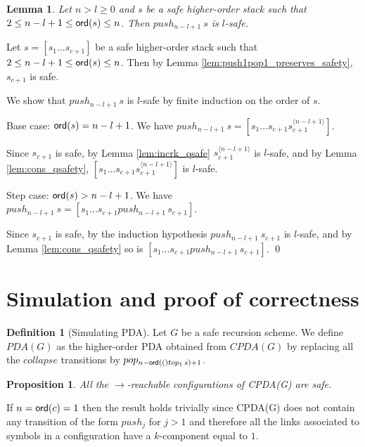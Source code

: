 \documentclass[a4paper]{article}
\newtheorem{lemma}{Lemma}[section]
\newtheorem{proposition}{Proposition}[section]
\theoremstyle{remark}
\theoremstyle{definition}
\newtheorem{definition}{Definition}[section]
\begin{document}
\begin{lemma}
\label{lem:pushj_safe_implies_l-safe} Let $n>l\geq 0$ and $s$ be a safe higher-order stack such that $2 \leq n-l+1 \leq {\sf ord}(s) \leq n$. Then $push_{n-l+1}\ s$ is $l$-safe.
\end{lemma}
\proof
Let $s=[s_1 \ldots s_{c+1}]$ be a safe higher-order stack such that $2 \leq n-l+1 \leq {\sf ord}(s) \leq n$. Then by Lemma \ref{lem:push1pop1_preserves_safety}, $s_{c+1}$ is safe.

We show that $push_{n-l+1}~s$ is $l$-safe by finite induction on the order of $s$.
    \begin{compactitem}
      \item Base case: ${\sf ord}(s) = n-l+1 $. We have
    $push_{n-l+1}~s = [ s_1 \ldots s_{c+1} s_{c+1}^{\langle n-l+1
    \rangle}]$.

    Since $s_{c+1}$ is safe,  by Lemma \ref{lem:incrk_qsafe} $s_{c+1}^{\langle n-l+1\rangle}$ is $l$-safe, and by Lemma
    \ref{lem:cons_qsafety},  $[ s_1 \ldots s_{c+1} s_{c+1}^{\langle n-l+1
    \rangle}]$ is $l$-safe.

      \item Step case: ${\sf ord}(s) > n-l+1$. We have
    $push_{n-l+1}~s = [ s_1 \ldots s_{c+1} push_{n-l+1}\,s_{c+1}]$.

    Since $s_{c+1}$ is safe, by the
    induction hypothesis $push_{n-l+1}~s_{c+1}$ is $l$-safe, and by Lemma \ref{lem:cons_qsafety} so is $[ s_1 \ldots s_{c+1} push_{n-l+1}\,s_{c+1}]$.
\qed
    \end{compactitem}





\section{Simulation and proof of correctness}
\begin{definition}[Simulating PDA]
Let $G$ be a safe recursion scheme.
We define $PDA(G)$ as the higher-order PDA obtained from
$CPDA(G)$ by replacing all the $collapse$ transitions by $pop_{n-{\sf ord}(()top_1\,s)+1}$.
\end{definition}

\begin{proposition}
All the $\rightarrow$-reachable configurations of CPDA(G) are safe.
\end{proposition}
\proof
If $n ={\sf ord}(c) =1$ then the result holds trivially since CPDA(G) does not contain
any transition of the form $push_j$ for $j>1$ and therefore all the links associated to symbols in a configuration have a $k$-component equal to $1$.
\end{document}
